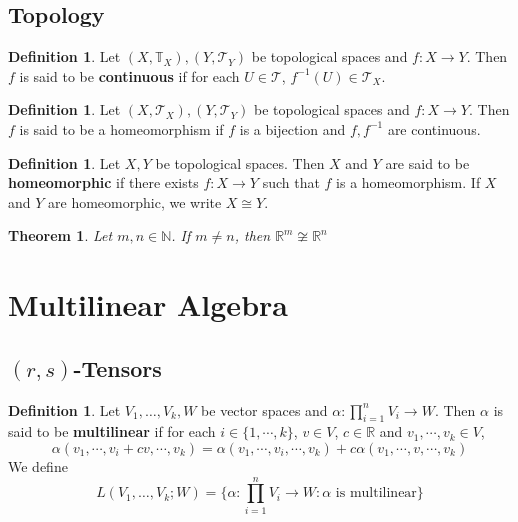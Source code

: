\documentclass[12pt]{amsart}
\newtheorem{thm}{Theorem}[subsection]
\theoremstyle{definition}
\newtheorem{defn}[definition]{Definition}
\theoremstyle{definition}
\newcommand{\al}{\alpha}
\newcommand{\N}{\mathbb{N}}
\newcommand{\R}{\mathbb{R}}
\newcommand{\T}{\mathbb{T}}
\newcommand{\MT}{\mathcal{T}}
\begin{document}
\newpage
\subsection{Topology}

\begin{defn}
Let $(X, \T_X), (Y, \MT_Y)$ be topological spaces and $f:X\rightarrow Y$. Then $f$ is said to be \textbf{continuous} if for each $U \in \MT$, $f^{-1}(U) \in \MT_X$.
\end{defn}

\begin{defn}
Let $(X, \MT_X), (Y, \MT_Y)$ be topological spaces and $f:X\rightarrow Y$. Then $f$ is said to be a homeomorphism if $f$ is a bijection and $f, f^{-1}$ are continuous. 
\end{defn}

\begin{defn}
Let $X, Y$ be topological spaces. Then $X$ and $Y$ are said to be \textbf{homeomorphic} if there exists $f:X \rightarrow Y$ such that $f$ is a homeomorphism. If $X$ and $Y$ are homeomorphic, we write $X \cong Y$. 
\end{defn}

\begin{thm}
Let $m,n \in \N$. If $m \neq n$, then $\R^m \not \cong \R^n$
\end{thm}






















\newpage
	\section{Multilinear Algebra}
	
	\subsection{$(r,s)$-Tensors}
	
	\begin{defn}
	Let $V_1, \dots, V_k, W$ be vector spaces and $\al : \prod_{i=1}^n V_i \rightarrow W$. Then $\al$ is said to be \textbf{multilinear} if for each $i \in \{1, \cdots, k\}$, $v \in V$, $c \in \R$ and $v_1, \cdots, v_k \in V$, $$\al(v_1, \cdots, v_i + cv, \cdots, v_k) = \al(v_1, \cdots, v_i, \cdots, v_k) + c\al(v_1, \cdots, v, \cdots, v_k)$$
	We define $$L(V_1, \dots, V_k; W) = \bigg \{\al : \prod_{i=1}^n V_i \rightarrow W: \al \text{ is multilinear} \bigg\}$$ 
	\end{defn}	
	
\end{document}
